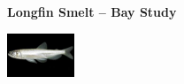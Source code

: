 \documentclass[]{article}\usepackage[]{graphicx}\usepackage[]{color}
\begin{document}
\vspace{0.5cm}

\begin{Row}
  \begin{Cell}{7}
    \begin{center}
      {\bf {\large Longfin Smelt – Bay Study}}
    \end{center}
  \end{Cell}
  \begin{Cell}{6}
    \begin{center}  
      \includegraphics[align=m]{figures/smelt/photo_longfin_smelt.png}
    \end{center}
  \end{Cell}
\end{Row}
\end{document}
